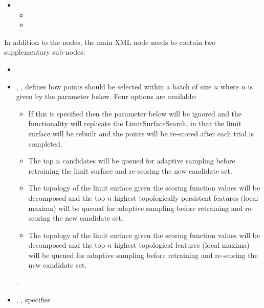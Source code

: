 
\begin{itemize}
    \item \variableChildrenIntro
    \begin{itemize}
      \item \distributionDescription
      \item \functionDescription
    \end{itemize}
\end{itemize}

In addition to the  nodes, the main XML node
 needs to contain two supplementary sub-nodes:

\begin{itemize}
  \item \convergenceDescription
  \item {}, , defines how
    points should be selected within a batch of size $n$ where $n$ is given by
    the  parameter below.
    Four options are available:
    \begin{itemize}
       \item {} If this is specified then the
        parameter below will be ignored and the
       functionality will replicate the LimitSurfaceSearch, in that the limit
       surface will be rebuilt and the points will be re-scored after each trial
       is completed.
       \item {} The top $n$ candidates will be queued for
       adaptive sampling before retraining the limit surface and re-scoring the
       new candidate set.
       \item {} The topology of the limit surface given the
       scoring function values will be decomposed and the top $n$ highest
       topologically persistent features (local maxima) will be queued for
       adaptive sampling before retraining and re-scoring the new candidate set.
       \item {} The topology of the limit surface given the
       scoring function values will be decomposed and the top $n$ highest
       topological features (local maxima) will be queued for adaptive sampling
       before retraining and re-scoring the new candidate set.
    \end{itemize}
  .
  \item {}, , specifies

\end{itemize}
